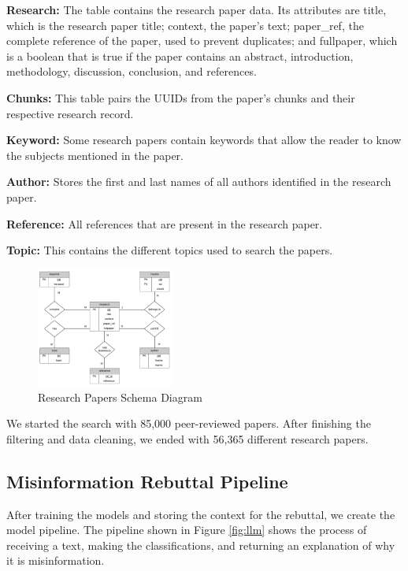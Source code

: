 \begin{description}
	\item{\textbf{Research:}}  The table contains the research paper data. Its attributes are title, which is the research paper title; context, the paper’s text; paper\_ref, the complete reference of the paper, used to prevent duplicates; and fullpaper, which is a boolean that is true if the paper contains an abstract, introduction, methodology, discussion, conclusion, and references.
	\item{\textbf{Chunks:}} This table pairs the UUIDs from the paper's chunks and their respective research record.  
	\item{\textbf{Keyword:}} Some research papers contain keywords that allow the reader to know the subjects mentioned in the paper. 
	\item{\textbf{Author:}} Stores the first and last names of all authors identified in the research paper. 
	\item{\textbf{Reference:}} All references that are present in the research paper.
	\item{\textbf{Topic:}} This contains the different topics used to search the papers.

\end{description}

\begin{figure}[h]
	\begin{center}
		\includegraphics[width=0.4\textwidth]{figures/Table_diagram.png} %
	\end{center}
	\caption{Research Papers Schema Diagram} %
	\label{fig:table}
\end{figure}


We started the search with 85,000 peer-reviewed papers. After finishing the filtering and data cleaning, we ended with 56,365 different research papers. 



\subsection{Misinformation Rebuttal Pipeline}
After training the models and storing the context for the rebuttal, we create the model pipeline. The pipeline shown in Figure \ref{fig:llm} shows the process of receiving a text, making the classifications, and returning an explanation of why it is misinformation.

